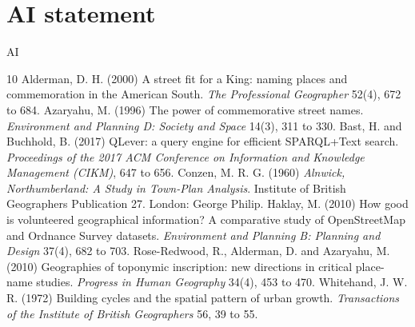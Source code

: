 \documentclass[11pt,a4paper]{article}
\begin{document}
\section*{AI statement}
{{AI}}

\begin{thebibliography}{10}
 Alderman, D. H. (2000) A street fit for a King: naming places and commemoration in the American South. \textit{The Professional Geographer} 52(4), 672 to 684.
 Azaryahu, M. (1996) The power of commemorative street names. \textit{Environment and Planning D: Society and Space} 14(3), 311 to 330.
 Bast, H. and Buchhold, B. (2017) QLever: a query engine for efficient SPARQL+Text search. \textit{Proceedings of the 2017 ACM Conference on Information and Knowledge Management (CIKM)}, 647 to 656.
 Conzen, M. R. G. (1960) \textit{Alnwick, Northumberland: A Study in Town-Plan Analysis}. Institute of British Geographers Publication 27. London: George Philip.
 Haklay, M. (2010) How good is volunteered geographical information? A comparative study of OpenStreetMap and Ordnance Survey datasets. \textit{Environment and Planning B: Planning and Design} 37(4), 682 to 703.
 Rose-Redwood, R., Alderman, D. and Azaryahu, M. (2010) Geographies of toponymic inscription: new directions in critical place-name studies. \textit{Progress in Human Geography} 34(4), 453 to 470.
 Whitehand, J. W. R. (1972) Building cycles and the spatial pattern of urban growth. \textit{Transactions of the Institute of British Geographers} 56, 39 to 55.
\end{thebibliography}
\end{document}
